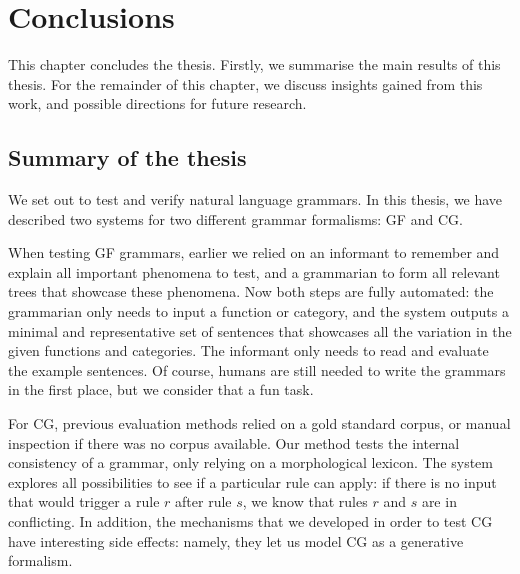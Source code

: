 \chapter{Conclusions}
\label{chapterConclusions}


This chapter concludes the thesis.  Firstly, we summarise the main
results of this thesis.  For the remainder of this chapter, we discuss
insights gained from this work, and possible directions for future
research.

\section{Summary of the thesis}

We set out to test and verify natural language grammars. In this
thesis, we have described two systems for two different grammar
formalisms: GF and CG.

When testing GF grammars, earlier we relied on an informant to
remember and explain all important phenomena to test, and a
grammarian to form all relevant trees that showcase these phenomena. 
Now both steps are fully automated: the grammarian only needs to input
a function or category, and the system outputs a minimal and
representative set of sentences that showcases all the variation in
the given functions and categories. The informant only needs to read and
evaluate the example sentences.
Of course, humans are still needed to write the grammars in the
first place, but we consider that a fun task.

For CG, previous evaluation methods relied on a gold standard corpus,
or manual inspection if there was no corpus available. Our method
tests the internal consistency of a grammar, only relying on a
morphological lexicon. The system explores all possibilities to see if
a particular rule can apply: if there is no input that would trigger a
rule $r$ after rule $s$, we know that rules $r$ and $s$ are in
conflicting.  In addition, the mechanisms that we developed in order
to test CG have interesting side effects: namely, they let us model CG
as a generative formalism.



